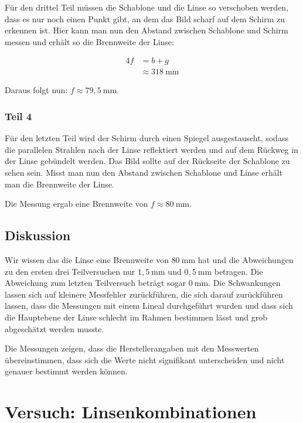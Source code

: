             Für den drittel Teil müssen die Schablone und die Linse so verschoben werden, dass es nur noch einen Punkt gibt, an dem das Bild scharf auf dem Schirm zu erkennen ist. Hier kann man nun den Abstand zwischen Schablone und Schirm messen und erhält so die Brennweite der Linse:

            $$
            \begin{aligned}
                4f &= b + g\\
                &\approx 318\ \mathrm{mm}
            \end{aligned}
            $$

            Daraus folgt nun: $f \approx 79,5\ \mathrm{mm}$.

        \subsubsection{Teil 4}
        
            Für den letzten Teil wird der Schirm durch einen Spiegel ausgestauscht, sodass die parallelen Strahlen nach der Linse reflektiert werden und auf dem Rückweg in der Linse gebündelt werden. Das Bild sollte auf der Rückseite der Schablone zu sehen sein. Misst man nun den Abstand zwischen Schablone und Linse erhält man die Brennweite der Linse.

            Die Messung ergab eine Brennweite von $f \approx 80\ \mathrm{mm}$.

    \subsection{Diskussion}

        Wir wissen das die Linse eine Brennweite von $80\ \mathrm{mm}$ hat und die Abweichungen zu den ersten drei Teilversuchen nur $1,5\ \mathrm{mm}$ und $0,5\ \mathrm{mm}$ betragen. Die Abweichung zum letzten Teilversuch beträgt sogar $0\ \mathrm{mm}$. Die Schwankungen lassen sich auf kleinere Messfehler zurückführen, die sich darauf zurückführen lassen, dass die Messungen mit einem Lineal durchgeführt wurden und dass sich die Hauptebene der Linse schlecht im Rahmen bestimmen lässt und grob abgeschätzt werden musste.

        Die Messungen zeigen, dass die Herstellerangaben mit den Messwerten übereinstimmen, dass sich die Werte nicht signifikant unterscheiden und nicht genauer bestimmt werden können.

\newpage

\section{Versuch: Linsenkombinationen}

